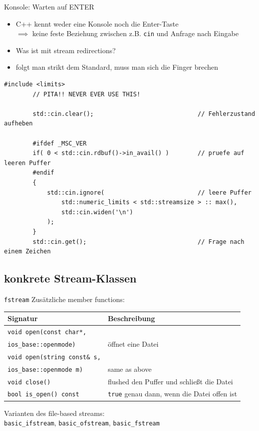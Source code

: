 \begin{frame}[fragile]{Konsole: Warten auf ENTER}
	\footnotesize
	\begin{itemize}
		\item C++ kennt weder eine Konsole noch die Enter-Taste	\\
			$\implies$ keine feste Beziehung zwischen z.B. \texttt{cin} und Anfrage nach Eingabe
		\item Was ist mit stream redirections?
		\item folgt man strikt dem Standard, muss man sich die Finger brechen
	\end{itemize}
	
	\pause
	
	\begin{lstlisting}[basicstyle=\scriptsize]
		#include <limits>
		// PITA!! NEVER EVER USE THIS!
		
		std::cin.clear();                             // Fehlerzustand aufheben
		
		#ifdef _MSC_VER
		if( 0 < std::cin.rdbuf()->in_avail() )        // pruefe auf leeren Puffer
		#endif
		{
		    std::cin.ignore(                          // leere Puffer
		        std::numeric_limits < std::streamsize > :: max(),
		        std::cin.widen('\n')
		    );
		}
		std::cin.get();                               // Frage nach einem Zeichen
	\end{lstlisting}
\end{frame}


\subsection{konkrete Stream-Klassen}

\begin{frame}{\texttt{fstream}}
	Zusätzliche member functions:
	\vspace{1em}
	
	\footnotesize
	
	\begin{tabular}{ll}
		\textbf{Signatur}	&	\textbf{Beschreibung}	\\
		\hline
		\texttt{void open(const char*,}\\
			\hspace{2em} \texttt{ios\_base::openmode)}	&	öffnet eine Datei	\\
		\texttt{void open(string const\& s,}\\
			\hspace{2em} \texttt{ios\_base::openmode m)}	&	same as above	\\
		\texttt{void close()}	&	flushed den Puffer und schließt die Datei	\\
		\texttt{bool is\_open() const}	&	\texttt{true} genau dann, wenn die Datei offen ist	\\
	\end{tabular}
	
	\pause
	\vspace{2em}
	
	Varianten des file-based streams:	\\
	\texttt{basic\_ifstream}, \texttt{basic\_ofstream}, \texttt{basic\_fstream}
\end{frame}

